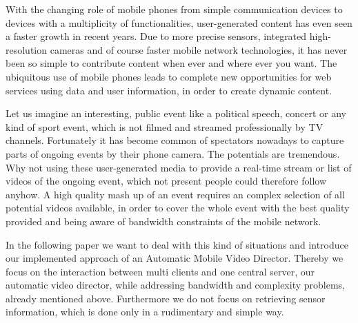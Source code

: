 \documentclass[conference]{IEEEtran}
\begin{document}
With the changing role of mobile phones from simple communication devices to devices with a multiplicity of functionalities, user-generated content has even seen a faster growth in recent years. Due to more precise sensors, integrated high-resolution cameras and of course faster mobile network technologies, it has never been so simple to contribute content when ever and where ever you want. 
The ubiquitous use of mobile phones leads to complete new opportunities for web services using data and user information, in order to create dynamic content.

Let us imagine an interesting, public event like a political speech, concert or any kind of sport event, which is not filmed and streamed professionally by TV channels. Fortunately it has become common of spectators nowadays to capture parts of ongoing events by their phone camera. The potentials are tremendous. Why not using these user-generated media to provide a real-time stream or list of videos of the ongoing event, which not present people could therefore follow anyhow. A high quality mash up of an event requires an complex selection of all potential videos available, in order to cover the whole event with the best quality provided and being aware of bandwidth constraints of the mobile network. 

In the following paper we want to deal with this kind of situations and introduce our implemented approach of an Automatic Mobile Video Director. Thereby we focus on the interaction between multi clients and one central server, our automatic video director, while addressing bandwidth and complexity problems, already mentioned above. Furthermore we do not focus on retrieving sensor information, which is done only in a rudimentary and simple way.


%
%
\end{document}
